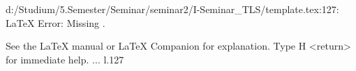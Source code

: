 \relax 
d:/Studium/5.Semester/Seminar/seminar2/I-Seminar_TLS/template.tex:127: LaTeX Error: Missing .

See the LaTeX manual or LaTeX Companion for explanation.
Type  H <return>  for immediate help. ...                                                                                                l.127                                                   	%
\providecommand*\new@tpo@label[2]{}

